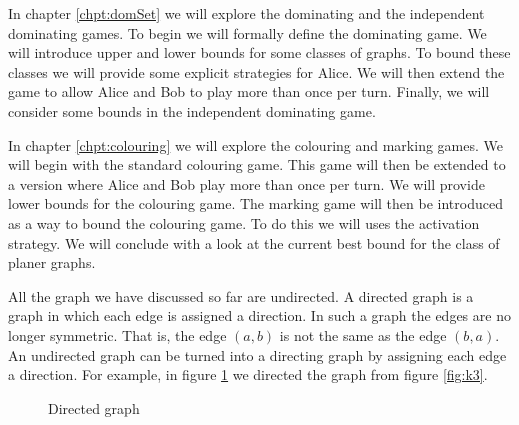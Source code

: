 In chapter \ref{chpt:domSet} we will explore the dominating and the independent dominating games. To begin we  will formally define the dominating game. We will introduce upper and lower bounds for some classes of graphs. To bound these classes we will provide some explicit strategies for Alice. We will then extend the game to allow Alice and Bob to play more than once per turn. Finally, we will consider some bounds in the independent dominating game.

In chapter \ref{chpt:colouring} we will explore the colouring and marking games. We will begin with the standard colouring game. This game will then be extended to a version where Alice and Bob play more than once per turn. We will provide lower bounds for the colouring game. The marking game will then be introduced as a way to bound the colouring game. To do this we will uses the activation strategy. We will conclude with a look at the current best bound for the class of planer graphs.




    
All the graph we have discussed so far are undirected. A directed graph is a graph in which each edge is assigned a direction. In such a graph the edges are no longer symmetric. That is, the edge $(a,b)$ is not the same as the edge $(b,a)$. An undirected graph can be turned into a directing graph by assigning each edge a direction. For example, in figure \ref{fig:directed_graph} we directed the graph from figure \ref{fig:k3}. %
\begin{figure}[h]
    \centering
    \caption{Directed graph}
    \label{fig:directed_graph}
\end{figure}
   
